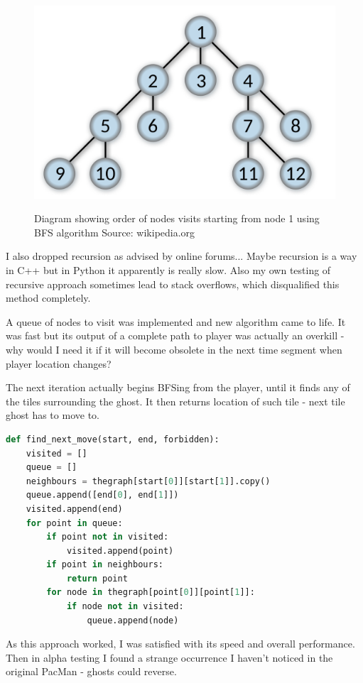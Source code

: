\documentclass[11pt,a4paper]{report}
\newenvironment{img}{
	\begin{center}
		\begin{figure}[H]
			\begin{center}
			
}{
	\end{center}
		\end{figure}
			\end{center}
}
\begin{document}
					\begin{img}
						\includegraphics[width=350pt]{images/bfs-diagram}\\
						\caption{Diagram showing order of nodes visits starting from node 1 using BFS algorithm Source: wikipedia.org}
					\end{img}
					
					I also dropped recursion as advised by online forums... Maybe recursion is a way in C++ but in Python it apparently is really slow. Also my own testing of recursive approach sometimes lead to stack overflows, which disqualified this method completely.
					
					A queue of nodes to visit was implemented and new algorithm came to life. It was fast but its output of a complete path to player was actually an overkill - why would I need it if it will become obsolete in the next time segment when player location changes?
					
					The next iteration actually begins BFSing from the player, until it finds any of the tiles surrounding the ghost. It then returns location of such tile - next tile ghost has to move to.
					
					\begin{lstlisting}[language=Python]
def find_next_move(start, end, forbidden):
	visited = []
	queue = []
	neighbours = thegraph[start[0]][start[1]].copy()
	queue.append([end[0], end[1]])
	visited.append(end)
	for point in queue:
		if point not in visited:
			visited.append(point)
		if point in neighbours:
			return point
		for node in thegraph[point[0]][point[1]]:
			if node not in visited:
				queue.append(node)
					\end{lstlisting}
					
					As this approach worked, I was satisfied with its speed and overall performance. Then in alpha testing I found a strange occurrence I haven't noticed in the original PacMan - ghosts could reverse.
					
\end{document}
